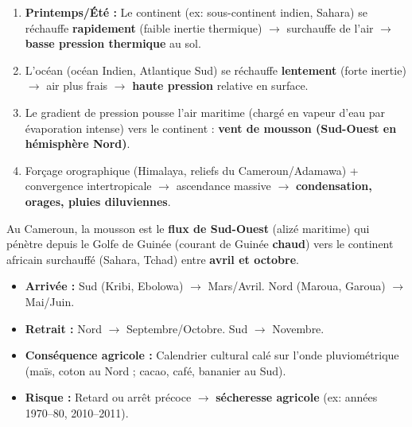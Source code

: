 \documentclass[11pt]{article}
\begin{document}
\begin{methode}
\begin{enumerate}
    \item \textbf{Printemps/Été :} Le continent (ex: sous-continent indien, Sahara) se réchauffe \textbf{rapidement} (faible inertie thermique) $\rightarrow$ surchauffe de l'air $\rightarrow$ \textbf{basse pression thermique} au sol.
    \item L'océan (océan Indien, Atlantique Sud) se réchauffe \textbf{lentement} (forte inertie) $\rightarrow$ air plus frais $\rightarrow$ \textbf{haute pression} relative en surface.
    \item Le gradient de pression pousse l'air maritime (chargé en vapeur d'eau par évaporation intense) vers le continent : \textbf{vent de mousson (Sud-Ouest en hémisphère Nord)}.
    \item Forçage orographique (Himalaya, reliefs du Cameroun/Adamawa) + convergence intertropicale $\rightarrow$ ascendance massive $\rightarrow$ \textbf{condensation, orages, pluies diluviennes}.
\end{enumerate}
\end{methode}

\begin{exemplebox}
Au Cameroun, la mousson est le \textbf{flux de Sud-Ouest} (alizé maritime) qui pénètre depuis le Golfe de Guinée (courant de Guinée \textbf{chaud}) vers le continent africain surchauffé (Sahara, Tchad) entre \textbf{avril et octobre}.
\begin{itemize}
    \item \textbf{Arrivée :} Sud (Kribi, Ebolowa) $\rightarrow$ Mars/Avril. Nord (Maroua, Garoua) $\rightarrow$ Mai/Juin.
    \item \textbf{Retrait :} Nord $\rightarrow$ Septembre/Octobre. Sud $\rightarrow$ Novembre.
    \item \textbf{Conséquence agricole :} Calendrier cultural calé sur l'onde pluviométrique (maïs, coton au Nord ; cacao, café, bananier au Sud).
    \item \textbf{Risque :} Retard ou arrêt précoce $\rightarrow$ \textbf{sécheresse agricole} (ex: années 1970--80, 2010--2011).
\end{itemize}
\end{exemplebox}
\end{document}
